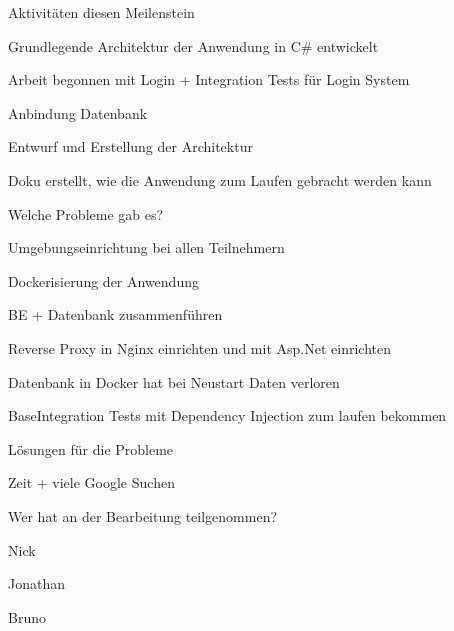 \documentclass{article}
\begin{document}
\begin{description}[font=$\bullet$]
  \item Aktivitäten diesen Meilenstein
        \begin{description}[font=$\bullet$]
          \item Grundlegende Architektur der Anwendung in C\# entwickelt
          \item Arbeit begonnen mit Login + Integration Tests für Login System
          \item Anbindung Datenbank
          \item Entwurf und Erstellung der Architektur
          \item Doku erstellt, wie die Anwendung zum Laufen gebracht werden kann
        \end{description}



  \item Welche Probleme gab es?
        \begin{description}[font=$\bullet$]
          \item Umgebungseinrichtung bei allen Teilnehmern
          \item Dockerisierung der Anwendung
          \item BE + Datenbank zusammenführen
          \item Reverse Proxy in Nginx einrichten und mit Asp.Net einrichten
          \item Datenbank in Docker hat bei Neustart Daten verloren
          \item BaseIntegration Tests mit Dependency Injection zum laufen bekommen
        \end{description}

  \item Lösungen für die Probleme
        \begin{description}[font=$\bullet$]
          \item Zeit + viele Google Suchen
        \end{description}
  \item Wer hat an der Bearbeitung teilgenommen?
        \begin{description}[font=$\bullet$]
          \item Nick
          \item Jonathan
          \item Bruno
        \end{description}
\end{description}
\end{document}
